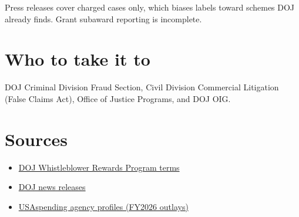 \documentclass[letterpaper,11pt]{article}
\providecommand{\tightlist}{\setlength{\itemsep}{0pt}\setlength{\parskip}{0pt}}
\begin{document}
Press releases cover charged cases only, which biases labels toward
schemes DOJ already finds. Grant subaward reporting is incomplete.

\hypertarget{who-to-take-it-to}{%
\section{Who to take it to}\label{who-to-take-it-to}}

DOJ Criminal Division Fraud Section, Civil Division Commercial
Litigation (False Claims Act), Office of Justice Programs, and DOJ OIG.

\hypertarget{sources}{%
\section{Sources}\label{sources}}

\begin{itemize}
\tightlist
\item
  \href{https://www.justice.gov/fraud/whistleblower}{DOJ Whistleblower
  Rewards Program terms}
\item
  \href{https://www.justice.gov/news}{DOJ news releases}
\item
  \href{https://www.usaspending.gov/agency}{USAspending agency profiles
  (FY2026 outlays)}
\end{itemize}
\end{document}
